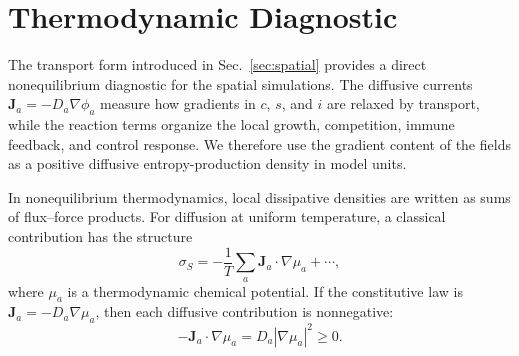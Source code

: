 \section{Thermodynamic Diagnostic}\label{sec:thermodynamics}

The transport form introduced in Sec.~\ref{sec:spatial} provides a direct nonequilibrium diagnostic for the spatial simulations. The diffusive currents $\mathbf{J}_a=-D_a\nabla\phi_a$ measure how gradients in $c$, $s$, and $i$ are relaxed by transport, while the reaction terms organize the local growth, competition, immune feedback, and control response. We therefore use the gradient content of the fields as a positive diffusive entropy-production density in model units.

In nonequilibrium thermodynamics, local dissipative densities are written as sums of flux--force products. For diffusion at uniform temperature, a classical contribution has the structure
\begin{equation}
    \sigma_S
    =-\frac{1}{T}\sum_a \mathbf{J}_a\cdot\nabla\mu_a+\cdots ,
    \label{eq:entropy-flux-force}
\end{equation}
where $\mu_a$ is a thermodynamic chemical potential. If the constitutive law is $\mathbf{J}_a=-D_a\nabla\mu_a$, then each diffusive contribution is nonnegative:
\begin{equation}
    -\mathbf{J}_a\cdot\nabla\mu_a
    =D_a\left|\nabla\mu_a\right|^2\geq 0 .
    \label{eq:positive-mu-diss}
\end{equation}

